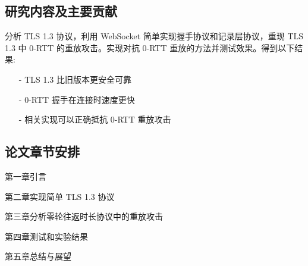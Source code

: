 \subsection{研究内容及主要贡献}

分析 TLS 1.3 协议，利用 WebSocket 简单实现握手协议和记录层协议，重现 TLS 1.3 中 0-RTT 的重放攻击。实现对抗 0-RTT 重放的方法并测试效果。得到以下结果:

\begin{itemize}
  \item[-] TLS 1.3 比旧版本更安全可靠
  \item[-] 0-RTT 握手在连接时速度更快
  \item[-] 相关实现可以正确抵抗 0-RTT 重放攻击
\end{itemize}

\subsection{论文章节安排}
\label{sec:arrangement}

第一章引言

第二章实现简单 TLS 1.3 协议

第三章分析零轮往返时长协议中的重放攻击

第四章测试和实验结果

第五章总结与展望

\newpage